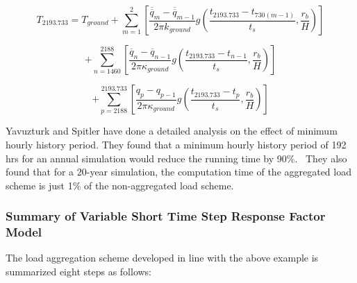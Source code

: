 \begin{equation}
{T_{2193.733}} = {T_{ground}} + \sum\limits_{m = 1}^2 {\left[ {\frac{{{{\overline{\overline q} }_m} - {{\overline{\overline q} }_{m - 1}}}}{{2\pi {k_{ground}}}}g\left( {\frac{{{t_{2193.733}} - {t_{730(m - 1)}}}}{{{t_s}}},\frac{{{r_b}}}{H}} \right)} \right]}
\end{equation}

\begin{equation}
+ \sum\limits_{n = 1460}^{2188} {\left[ {\frac{{{{\overline q }_n} - {{\overline q }_{n - 1}}}}{{2\pi {\kappa_{ground}}}}g\left( {\frac{{{t_{2193.733}} - {t_{n - 1}}}}{{{t_s}}},\frac{{{r_b}}}{H}} \right)} \right]}
\end{equation}

\begin{equation}
+ \sum\limits_{p = 2188}^{2193.733} {\left[ {\frac{{{q_p} - {q_{p - 1}}}}{{2\pi {\kappa_{ground}}}}g\left( {\frac{{{t_{2193.733}} - {t_p}}}{{{t_s}}},\frac{{{r_b}}}{H}} \right)} \right]}
\end{equation}

Yavuzturk and Spitler have done a detailed analysis on the effect of minimum hourly history period. They found that a minimum hourly history period of 192 hrs for an annual simulation would reduce the running time by 90\%.~ They also found that for a 20-year simulation, the computation time of the aggregated load scheme is just 1\% of the non-aggregated load scheme.

\subsubsection{Summary of Variable Short Time Step Response Factor Model}\label{summary-of-variable-short-time-step-response-factor-model}

The load aggregation scheme developed in line with the above example is summarized eight steps as follows:

